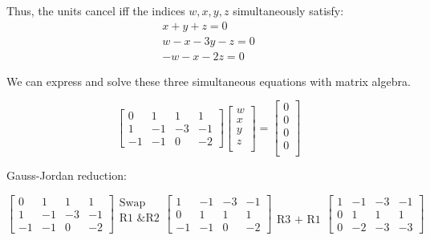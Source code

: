 \documentclass[a4paper]{report}
\begin{document}
Thus, the units cancel iff the indices $w,x,y,z$ simultaneously satisfy:
\begin{align}
x+y+z = 0 \\ w-x-3y-z = 0 \\ -w-x-2z = 0 
\end{align}

We can express and solve these three simultaneous equations with matrix algebra.

\begin{equation}
 \begin{bmatrix}
0  &  1 & 1  &  1 \\
1  & -1 & -3 & -1 \\
-1 & -1 & 0  & -2
\end{bmatrix}
\begin{bmatrix}
w \\ x \\ y \\ z \\
\end{bmatrix}
=
\begin{bmatrix}
0 \\ 0 \\ 0 \\ 0 \\
\end{bmatrix}
\end{equation}

Gauss-Jordan reduction:

\begin{equation*} 
\begin{bmatrix}
0  &  1 & 1  &  1 \\
1  & -1 & -3 & -1 \\
-1 & -1 & 0  & -2
\end{bmatrix}
\begin{matrix}
\text{Swap} \\
\text{R1 \& R2} \\
\\
\end{matrix}
\begin{bmatrix}
1  & -1 & -3 & -1 \\
0  &  1 & 1  &  1 \\
-1 & -1 & 0  & -2
\end{bmatrix}
\begin{matrix}
\\
\\
\text{R3 + R1}
\end{matrix}
\begin{bmatrix}
1  & -1 & -3 & -1 \\
0  &  1 & 1  &  1 \\
0 & -2 & -3  & -3
\end{bmatrix} 
\end{equation*}
\end{document}
